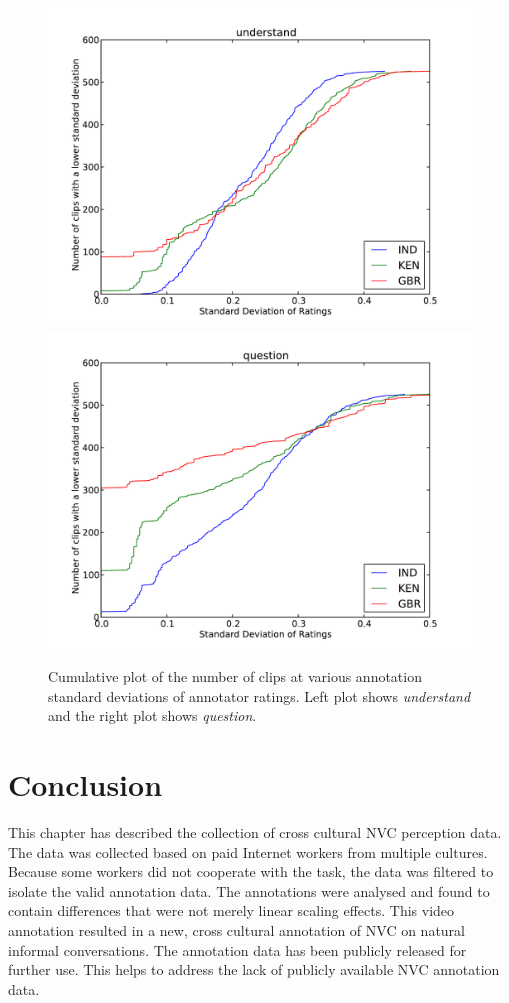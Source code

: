 \begin{figure}
\centering
\includegraphics[width = 0.45 \columnwidth]{annotation/annotunderstand.pdf}
\includegraphics[width = 0.45 \columnwidth]{annotation/annotquestion.pdf}
\caption[Cumulative plot of the number of clips at various annotation standard deviations of annotator ratings.]{Cumulative plot of the number of clips at various annotation standard deviations of annotator ratings. Left plot shows \textit{understand} and the right plot shows \textit{question}.}
\label{FigureAgreementOfAnnotators2}
\end{figure}

\section{Conclusion}


This chapter has described the collection of cross cultural \ac{NVC} perception data. The data was collected based on paid Internet workers from multiple cultures. Because some workers did not cooperate with the task, the data was filtered to isolate the valid annotation data. The annotations were analysed and found to contain differences that were not merely linear scaling effects. This video annotation resulted in a new, cross cultural annotation of \ac{NVC} on natural informal conversations. The annotation data has been publicly released for further use. This helps to address the lack of publicly available \ac{NVC} annotation data. 

